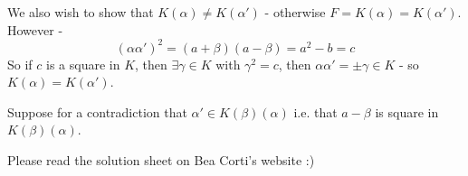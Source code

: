 \documentclass{article}
\theoremstyle{definition}
\theoremstyle{plain}%
\theoremstyle{remark}
\begin{document}
We also wish to show that $K(\alpha) \ne K(\alpha')$ - otherwise $F = K(\alpha) = K(\alpha')$. However -
\[(\alpha\alpha')^2 = (a + \beta)(a - \beta) = a^2 - b = c\]
So if $c$ is a square in $K$, then $\exists \gamma \in K$ with $\gamma^2 = c$, then $\alpha\alpha' = \pm\gamma \in K$ - so $K(\alpha) = K(\alpha')$.

Suppose for a contradiction that $\alpha' \in K(\beta)(\alpha)$ i.e. that $a - \beta$ is square in $K(\beta)(\alpha)$.

Please read the solution sheet on Bea Corti's website :)
\end{document}
